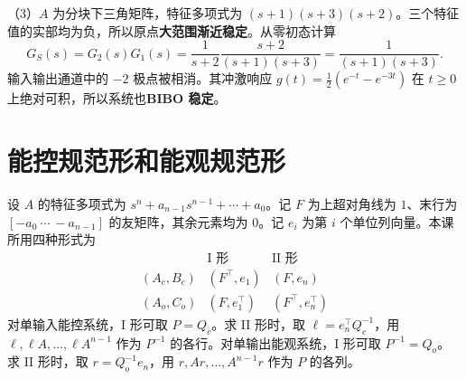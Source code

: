 {（3）$A$ 为分块下三角矩阵，特征多项式为 $(s+1)(s+3)(s+2)$。三个特征值的实部均为负，所以原点\textbf{大范围渐近稳定}。从零初态计算
\[
    G_S(s)=G_2(s)G_1(s)
          =\frac{1}{s+2}\frac{s+2}{(s+1)(s+3)}
          =\frac{1}{(s+1)(s+3)}.
\]
输入输出通道中的 $-2$ 极点被相消。其冲激响应 $g(t)=\frac12(e^{-t}-e^{-3t})$ 在 $t\ge 0$ 上绝对可积，所以系统也\textbf{BIBO 稳定}。
}

\section{能控规范形和能观规范形}

设 $A$ 的特征多项式为 $s^n+a_{n-1}s^{n-1}+\cdots+a_0$。记 $F$ 为上超对角线为 $1$、末行为 $[-a_0\ \cdots\ -a_{n-1}]$ 的友矩阵，其余元素均为 $0$。记 $e_i$ 为第 $i$ 个单位列向量。本课所用四种形式为
\[
\begin{array}{c|c|c}
    & \text{I 形} & \text{II 形}\\ \hline
    (A_c,B_c) & (F^\top,e_1)&(F,e_n)\\
    (A_o,C_o) & (F,e_1^\top)&(F^\top,e_n^\top)
\end{array}
\]
对单输入能控系统，I 形可取 $P=Q_c$。求 II 形时，取 $\ell=e_n^\top Q_c^{-1}$，用 $\ell,\ell A,\ldots,\ell A^{n-1}$ 作为 $P^{-1}$ 的各行。对单输出能观系统，I 形可取 $P^{-1}=Q_o$。求 II 形时，取 $r=Q_o^{-1}e_n$，用 $r,Ar,\ldots,A^{n-1}r$ 作为 $P$ 的各列。


